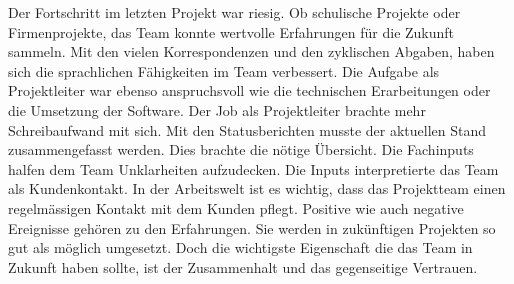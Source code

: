 Der Fortschritt im letzten Projekt war riesig. Ob schulische Projekte oder Firmenprojekte, das Team konnte wertvolle Erfahrungen für die Zukunft sammeln. Mit den vielen Korrespondenzen und den zyklischen Abgaben, haben sich die sprachlichen Fähigkeiten im Team verbessert. Die Aufgabe als Projektleiter war ebenso anspruchsvoll wie die technischen Erarbeitungen oder die Umsetzung der Software. Der Job als Projektleiter brachte mehr Schreibaufwand mit sich. Mit den Statusberichten musste der aktuellen Stand zusammengefasst werden. Dies brachte die nötige Übersicht. Die Fachinputs halfen dem Team Unklarheiten aufzudecken. Die Inputs interpretierte das Team als Kundenkontakt. In der Arbeitswelt ist es wichtig, dass das Projektteam einen regelmässigen Kontakt mit dem Kunden pflegt.
Positive wie auch negative Ereignisse gehören zu den Erfahrungen. Sie werden in zukünftigen Projekten so gut als möglich umgesetzt. Doch die wichtigste Eigenschaft die das Team in Zukunft haben sollte, ist der Zusammenhalt und das gegenseitige Vertrauen.
